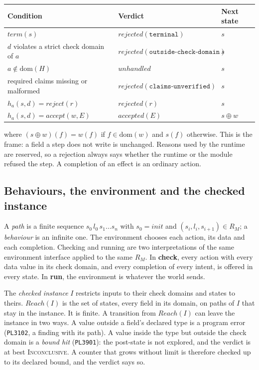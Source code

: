 \documentclass[11pt]{article}
\begin{document}
\begin{center}
\small
\begin{tabular}{lll}
\toprule
Condition & Verdict & Next state\\
\midrule
$\mathit{term}(s)$ & $\mathit{rejected}(\texttt{terminal})$ & $s$\\
$d$ violates a strict check domain of $a$ & $\mathit{rejected}(\texttt{outside-check-domain})$ & $s$\\
$a \notin \mathrm{dom}(H)$ & $\mathit{unhandled}$ & $s$\\
required claims missing or malformed & $\mathit{rejected}(\texttt{claims-unverified})$ & $s$\\
$h_a(s, d) = \mathit{reject}(r)$ & $\mathit{rejected}(r)$ & $s$\\
$h_a(s, d) = \mathit{accept}(w, E)$ & $\mathit{accepted}(E)$ & $s \oplus w$\\
\bottomrule
\end{tabular}
\end{center}

\noindent where $(s \oplus w)(f) = w(f)$ if $f \in \mathrm{dom}(w)$ and $s(f)$ otherwise. This is the frame: a field a step does not write is unchanged. Reasons used by the runtime are reserved, so a rejection always says whether the runtime or the module refused the step. A completion of an effect is an ordinary action.

\subsection{Behaviours, the environment and the checked instance}

A \emph{path} is a finite sequence $s_0\, l_0\, s_1 \ldots s_n$ with $s_0 = \mathit{init}$ and $(s_i, l_i, s_{i+1}) \in R_M$; a \emph{behaviour} is an infinite one. The environment chooses each action, its data and each completion. Checking and running are two interpretations of the same environment interface applied to the same $R_M$. In \textbf{check}, every action with every data value in its check domain, and every completion of every intent, is offered in every state. In \textbf{run}, the environment is whatever the world sends.

The \emph{checked instance} $I$ restricts inputs to their check domains and states to theirs. $\mathit{Reach}(I)$ is the set of states, every field in its domain, on paths of $I$ that stay in the instance. It is finite. A transition from $\mathit{Reach}(I)$ can leave the instance in two ways. A value outside a field's declared type is a program error (\texttt{PL3102}, a finding with its path). A value inside the type but outside the check domain is a \emph{bound hit} (\texttt{PL3901}): the post-state is not explored, and the verdict is at best \textsc{Inconclusive}. A counter that grows without limit is therefore checked up to its declared bound, and the verdict says so.
\end{document}
